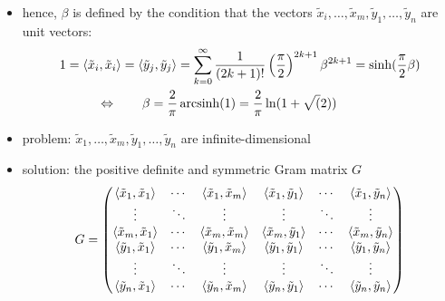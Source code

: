 	\begin{frame}
		\begin{pbmr}
			\begin{itemize}
				\item<1-> hence, $\beta$ is defined by the condition that the vectors $\tilde{x}_i,\dots,\tilde{x}_m,\tilde{y}_1,\dots,\tilde{y}_n$ are unit vectors:
					\begin{gather*}
						1 = \langle{\tilde{x}_i},{\tilde{x}_i}\rangle = \langle{\tilde{y}_j},{\tilde{y}_j}\rangle
						= \sum_{k=0}^\infty \frac{1}{(2k+1)!}\left(\frac{\pi}{2}\right)^{2k+1}\beta^{2k+1}=\sinh(\frac{\pi}{2}\beta)\\
						\Leftrightarrow \qquad\beta = \frac{2}{\pi} \operatorname{arcsinh}(1) = \frac{2}{\pi}\ln(1+\sqrt(2)) \qquad\quad~
					\end{gather*}
				\item<2-> problem: $\tilde{x}_1,\dots,\tilde{x}_m,\tilde{y}_1,\dots,\tilde{y}_n$ are infinite-dimensional
				\item<3-> solution: the positive definite and symmetric Gram matrix $G$
					\begin{equation}
						G=\begin{pmatrix}
							\langle{\tilde{x}_1},{\tilde{x}_1}\rangle & \cdots & \langle{\tilde{x}_1},{\tilde{x}_m}\rangle& \langle{\tilde{x}_1},{\tilde{y}_1}\rangle & \cdots & \langle{\tilde{x}_1},{\tilde{y}_n}\rangle \\
							 \vdots		& \ddots	& \vdots & \vdots & \ddots & \vdots\\
							 \langle{\tilde{x}_m},{\tilde{x}_1}\rangle & \cdots & \langle{\tilde{x}_m},{\tilde{x}_m}\rangle& \langle{\tilde{x}_m},{\tilde{y}_1}\rangle & \cdots & \langle{\tilde{x}_m},{\tilde{y}_n}\rangle \\
							\langle{\tilde{y}_1},{\tilde{x}_1}\rangle & \cdots & \langle{\tilde{y}_1},{\tilde{x}_m}\rangle& \langle{\tilde{y}_1},{\tilde{y}_1}\rangle & \cdots & \langle{\tilde{y}_1},{\tilde{y}_n}\rangle \\
							 \vdots		& \ddots	& \vdots& \vdots & \ddots & \vdots\\
							 \langle{\tilde{y}_n},{\tilde{x}_1}\rangle & \cdots & \langle{\tilde{y}_n},{\tilde{x}_m}\rangle& \langle{\tilde{y}_n},{\tilde{y}_1}\rangle & \cdots & \langle{\tilde{y}_n},{\tilde{y}_n}\rangle 
						\end{pmatrix}
					\end{equation}
			\end{itemize}
		\end{pbmr}
	\end{frame}
	
